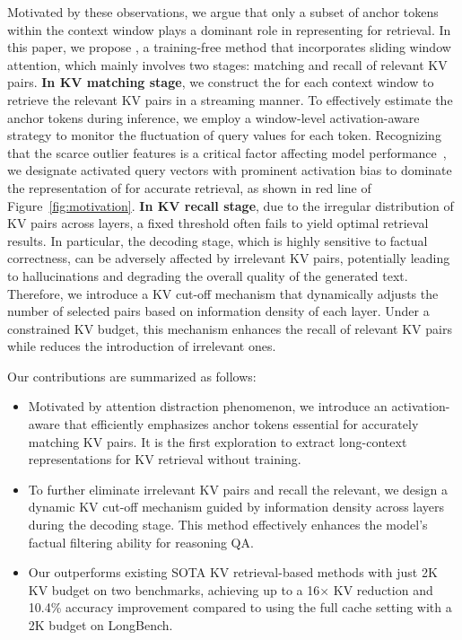 Motivated by these observations, we argue that only a subset of anchor tokens within the context window plays a dominant role in representing \pq for retrieval. In this paper, we propose \name, a training-free method that incorporates sliding window attention, which mainly involves two stages: matching and recall of relevant KV pairs. \textbf{In KV matching stage}, we construct the \pq for each context window to retrieve the relevant KV pairs in a streaming manner. To effectively estimate the anchor tokens during inference, we employ a window-level activation-aware strategy to monitor the fluctuation of query values for each token. Recognizing that the scarce outlier features is a critical factor affecting model performance~\cite{wang2024learning,wu2024retrieval}, we designate activated query vectors with prominent activation bias to dominate the representation of \pq for accurate retrieval, as shown in {red line} of Figure~\ref{fig:motivation}. 
\textbf{In KV recall stage}, due to the irregular distribution of KV pairs across layers, a fixed threshold often fails to yield optimal retrieval results. In particular, the decoding stage, which is highly sensitive to factual correctness, can be adversely affected by irrelevant KV pairs, potentially leading to hallucinations and degrading the overall quality of the generated text. Therefore, we introduce a KV cut-off mechanism that dynamically adjusts the number of selected pairs based on information density of each layer. Under a constrained KV budget, this mechanism enhances the recall of relevant KV pairs while reduces the introduction of irrelevant ones.


Our contributions are summarized as follows:
\vspace{-0.4em}
\begin{itemize}
  \item Motivated by attention distraction phenomenon, we introduce an activation-aware \pq that efficiently emphasizes anchor tokens essential for accurately matching KV pairs. It is the first exploration to extract long-context representations for KV retrieval without training.
  \vspace{-0.4em}
  \item To further eliminate irrelevant KV pairs and recall the relevant, we design a dynamic KV cut-off mechanism guided by information density across layers during the decoding stage. This method effectively enhances the model's factual filtering ability for reasoning QA.
  \vspace{-0.4em}
  \item Our \name outperforms existing SOTA KV retrieval-based methods with just 2K KV budget on two benchmarks, achieving up to a 16× KV reduction and 10.4\% accuracy improvement compared to using the full cache setting with a 2K budget on LongBench.
\end{itemize}

